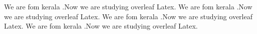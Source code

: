 \documentclass[12pt]{report}
\begin{document}
	\begin{multicols}{3}
		We are fom kerala .Now we are studying overleaf Latex.	We are fom kerala .Now we are studying overleaf Latex.	We are fom kerala .Now we are studying overleaf Latex.	We are fom kerala .Now we are studying overleaf Latex.
	\end{multicols}
	
\end{document}
